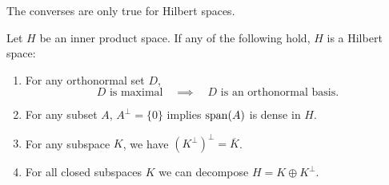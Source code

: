 The converses are only true for Hilbert spaces.
\begin{theorem} \label{theorem:criterionHilbertSpace}
Let $H$ be an inner product space. If any of the following hold, $H$ is a Hilbert space:
\begin{enumerate}
\item For any orthonormal set $D$,
\[ \text{$D$ is maximal} \quad\implies\quad \text{$D$ is an orthonormal basis.} \]
\item For any subset $A$, $A^\perp = \{0\}$ implies $\operatorname{span}(A)$ is dense in $H$.
\item For any subspace $K$, we have $(K^\perp)^\perp = \overline{K}$.
\item For all closed subspaces $K$ we can decompose $H = K\oplus K^\perp$.
\end{enumerate}
\end{theorem}
